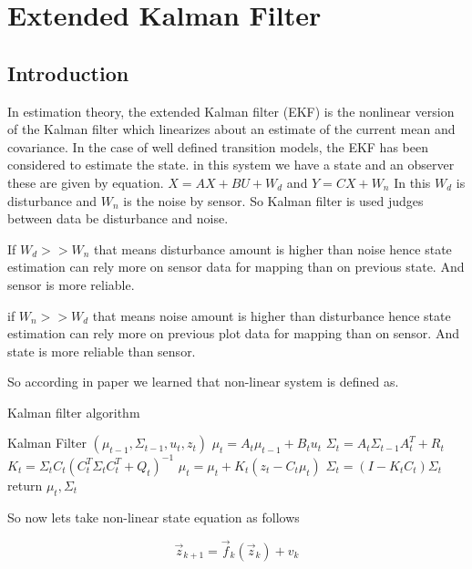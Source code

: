 \section{Extended Kalman Filter}
\label{Spline_1}

\subsection{Introduction}
In estimation theory, the extended Kalman filter (EKF) is the nonlinear version of the Kalman filter which linearizes about an estimate of the current mean and covariance. In the case of well defined transition models, the EKF has been considered to estimate the state. 
in this system we have a state and an observer these are given by equation.
$ X=AX +BU + W_d $  and $ Y=CX + W_n $
In this $ W_d $ is disturbance and $ W_n $ is the noise by sensor.
So Kalman filter is used judges between data be disturbance and noise.

If $W_d >> W_n$ that means disturbance amount is higher than noise hence state estimation can rely more on sensor data for mapping than on previous state. And sensor is more reliable.

if $W_n >> W_d$ that means noise amount is higher than disturbance hence state estimation can rely more on previous plot data for mapping than on sensor. And state is more reliable than sensor.

So according in paper we learned that non-linear system is defined as.



\begin{algorithm}
\caption{Kalman filter algorithm}\label{alg-gd}
\begin{algorithmic}[1]
\STATE Kalman Filter \({(\mu_{t-1},\Sigma_{t-1},u_t,z_t)}\)
\STATE \( {\mu_{t}}=A_t \mu_{t-1} + B_t u_t \)
\STATE \( \Sigma_{t}=A_t \Sigma_{t-1} A_t^T +R_t\)
\STATE \( K_t = \Sigma_{t} C_t(C_t^T \Sigma_{t}C_t^T+Q_t)^{-1}\)
\STATE \( \mu_{t}=\mu_{t}+K_t(z_t-C_t \mu_t) \)
\STATE \(\Sigma_{t}=(I-K_t C_t)\Sigma_{t}\)
\STATE return \( \mu_t ,  \Sigma_t \)
\end{algorithmic}
\end{algorithm}

So now lets take non-linear state equation as follows

\begin{equation}
\overrightarrow{z}_{k+1}= \overrightarrow{f}_k (\overrightarrow{z}_k) + v_k 
\end{equation}

